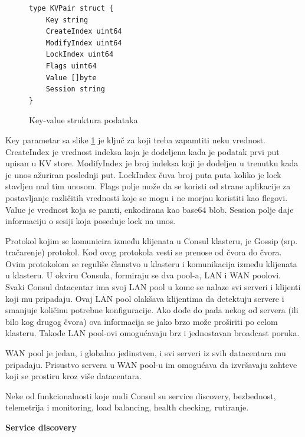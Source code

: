 \documentclass[a4paper,12pt]{report}
\begin{document}
\begin{figure}

\begin{verbatim}
type KVPair struct {
   	Key string
   	CreateIndex uint64
   	ModifyIndex uint64
   	LockIndex uint64
   	Flags uint64
   	Value []byte
   	Session string
}
\end{verbatim}
    \caption{Key-value struktura podataka}
    \label{kv-ds}
\end{figure}

Key parametar sa slike \ref{kv-ds} je ključ za koji treba zapamtiti neku vrednost. CreateIndex je vrednost indeksa koja je dodeljena kada je podatak prvi put upisan u KV store. ModifyIndex je broj indeksa koji je dodeljen u trenutku kada je unos ažuriran poslednji put. LockIndex čuva broj puta puta koliko je lock stavljen nad tim unosom. Flags polje može da se koristi od strane aplikacije za postavljanje različitih vrednosti koje se mogu i ne morjau koristiti kao flegovi. Value je vrednost koja se pamti, enkodirana kao base64 blob. Session polje daje informaciju o sesiji koja poseduje lock na unos. \newline

Protokol kojim se komunicira između klijenata u Consul klasteru, je Gossip (srp. tračarenje) protokol. Kod ovog protokola vesti se prenose od čvora do čvora. Ovim protokolom se reguliše članstvo u klasteru i komunikacija između klijenata u klasteru. U okviru Consula, formiraju se dva pool-a, LAN i WAN poolovi. Svaki Consul datacentar ima svoj LAN pool u kome se nalaze svi serveri i klijenti koji mu pripadaju. Ovaj LAN pool olakšava klijentima da detektuju servere i smanjuje količinu potrebne konfiguracije. Ako dođe do pada nekog od servera (ili bilo kog drugog čvora) ova informacija se jako brzo može proširiti po celom klasteru. Takođe LAN pool-ovi omogućavaju brz i jednostavan broadcast poruka. \newline

WAN pool je jedan, i globalno jedinstven, i svi serveri iz svih datacentara mu pripadaju. Prisustvo servera u WAN pool-u im omogućava da izvršavaju zahteve koji se prostiru kroz više datacentara. \newline

Neke od funkcionalnosti koje nudi Consul su service discovery, bezbednost, telemetrija i monitoring, load balancing, health checking, rutiranje. \newline

\textbf{Service discovery}\newline
\end{document}
